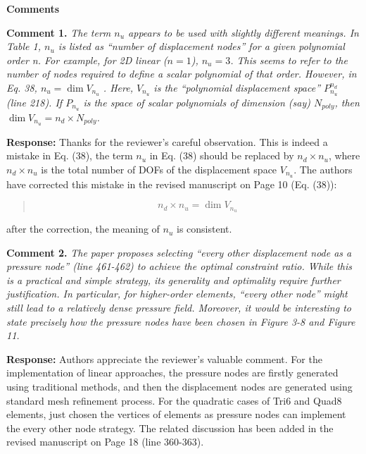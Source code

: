 \documentclass{article}
\begin{document}

\noindent\textbf{Comments}

\textbf{Comment 1.} \textit{The term $n_u$ appears to be used with slightly different meanings. In Table 1, $n_u$ is listed as “number of displacement nodes” for a given polynomial order n. For example, for 2D linear ($n = 1$), $n_u = 3$. This seems to refer to the number of nodes required to define a scalar polynomial of that order. However, in Eq. 38, $n_u = \dim V_{n_u}$ . Here, $V_{n_u}$ is the “polynomial displacement space” $P^{n_d}_{n_u}$ (line 218). If $P_{n_u}$ is the space of scalar polynomials of dimension (say) $N_{poly}$, then $\dim V_{n_u} = n_d\times N_{poly}$.}

\textbf{Response:} Thanks for the reviewer's careful observation.
This is indeed a mistake in Eq. (38), the term $n_u$ in Eq. (38) should be replaced by $n_d\times n_u$, where $n_d\times n_u$ is the total number of DOFs of the displacement space $V_{n_u}$.
The authors have corrected this mistake in the revised manuscript on Page 10 (Eq. (38)):
\begin{quote}
\begin{equation*}
n_d \times n_u = \dim V_{n_u}
\end{equation*}
\end{quote}
after the correction, the meaning of $n_u$ is consistent.

\textbf{Comment 2.} \textit{The paper proposes selecting “every other displacement node as a pressure node” (line 461-462) to achieve the optimal constraint ratio. While this is a practical and simple strategy, its generality and optimality require further justification. In particular, for higher-order elements, “every other node” might still lead to a relatively dense pressure field. Moreover, it would be interesting to state precisely how the pressure nodes have been chosen in Figure 3-8 and Figure
11.}

\textbf{Response:} Authors appreciate the reviewer's valuable comment.
For the implementation of linear approaches, the pressure nodes are firstly generated using traditional methods, and then the displacement nodes are generated using standard mesh refinement process.
For the quadratic cases of Tri6 and Quad8 elements, just chosen the vertices of elements as pressure nodes can implement the every other node strategy.
The related discussion has been added in the revised manuscript on Page 18 (line 360-363).
\end{document}
